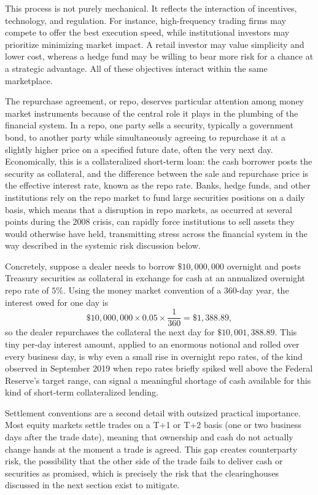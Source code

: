 \documentclass[../ai_in_finance]{subfiles}
\begin{document}
This process is not purely mechanical. It reflects the interaction of incentives, technology, and regulation. For instance, high-frequency trading firms may compete to offer the best execution speed, while institutional investors may prioritize minimizing market impact. A retail investor may value simplicity and lower cost, whereas a hedge fund may be willing to bear more risk for a chance at a strategic advantage. All of these objectives interact within the same marketplace.

The repurchase agreement, or repo, deserves particular attention among money market instruments because of the central role it plays in the plumbing of the financial system. In a repo, one party sells a security, typically a government bond, to another party while simultaneously agreeing to repurchase it at a slightly higher price on a specified future date, often the very next day. Economically, this is a collateralized short-term loan: the cash borrower posts the security as collateral, and the difference between the sale and repurchase price is the effective interest rate, known as the repo rate.
Banks, hedge funds, and other institutions rely on the repo market to fund large securities positions on a daily basis, which means that a disruption in repo markets, as occurred at several points during the 2008 crisis, can rapidly force institutions to sell assets they would otherwise have held, transmitting stress across the financial system in the way described in the systemic risk discussion below.

Concretely, suppose a dealer needs to borrow $\$10{,}000{,}000$ overnight and posts Treasury securities as collateral in exchange for cash at an annualized overnight repo rate of $5\%$. Using the money market convention of a 360-day year, the interest owed for one day is
\begin{equation*}
\$10{,}000{,}000 \times 0.05 \times \frac{1}{360} = \$1{,}388.89,
\end{equation*}
so the dealer repurchases the collateral the next day for $\$10{,}001{,}388.89$. This tiny per-day interest amount, applied to an enormous notional and rolled over every business day, is why even a small rise in overnight repo rates, of the kind observed in September 2019 when repo rates briefly spiked well above the Federal Reserve's target range, can signal a meaningful shortage of cash available for this kind of short-term collateralized lending.

Settlement conventions are a second detail with outsized practical importance. Most equity markets settle trades on a T+1 or T+2 basis (one or two business days after the trade date), meaning that ownership and cash do not actually change hands at the moment a trade is agreed. This gap creates counterparty risk, the possibility that the other side of the trade fails to deliver cash or securities as promised, which is precisely the risk that the clearinghouses discussed in the next section exist to mitigate.
\end{document}
